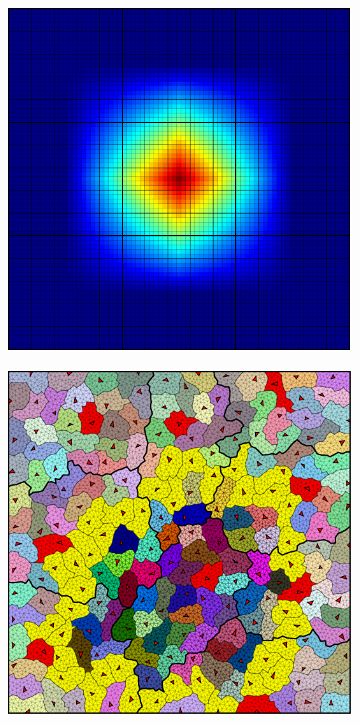 \begin{figure}[htbp]
\begin{subfigure}[t]{0.3\textwidth}
  \end{subfigure}
  \hfill
  \begin{subfigure}[t]{0.3\textwidth}
    \centerline{\includegraphics[width=0.9\linewidth]{figs/square/square_cart_struct_cell_ml_lvl2_basis}}
  \end{subfigure}
  \par\bigskip
  \begin{subfigure}[t]{0.3\textwidth}
    \centerline{\includegraphics[width=0.9\linewidth]{figs/square/square_tria_metis_cell_ml_lvl1_grid}}

\end{subfigure}
\end{figure}
